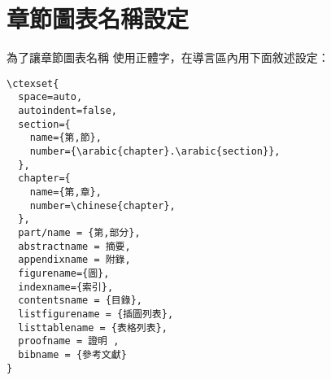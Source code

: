 \section{章節圖表名稱設定}
為了讓章節圖表名稱
使用正體字，在導言區\textit{}內用下面敘述設定：
\begin{verbatim}
\ctexset{
  space=auto,
  autoindent=false,
  section={
    name={第,節},
    number={\arabic{chapter}.\arabic{section}},
  },
  chapter={
    name={第,章},
    number=\chinese{chapter},
  },
  part/name = {第,部分},
  abstractname = 摘要,
  appendixname = 附錄,
  figurename={圖},
  indexname={索引},
  contentsname = {目錄},
  listfigurename = {插圖列表},
  listtablename = {表格列表},
  proofname = 證明 ,
  bibname = {參考文獻}
}

\end{verbatim}

